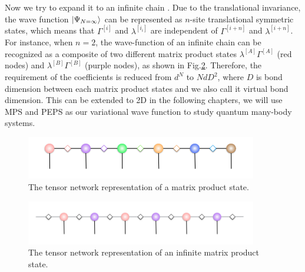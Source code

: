 Now we try to expand it to an infinite chain \cite{PhysRevLett.98.070201}. Due to the translational invariance, the wave function $\Ket{\Psi_{N=\infty}}$ can be represented as $n$-site translational symmetric states, which means that $\Gamma^{[i]}$ and $\lambda^{[i_{i}]}$ are independent of $\Gamma^{[i+n]}$ and $\lambda^{[i+n]}$. For instance, when $n=2$, the wave-function of an infinite chain can be recognized as a composite of two different matrix product states $\lambda^{[A]}\Gamma^{[A]}$ (red nodes) and $\lambda^{[B]}\Gamma^{[B]}$ (purple nodes), as shown in Fig.\ref{fig312}. Therefore, the requirement of the coefficients is reduced from $d^N$ to $NdD^2$, where $D$ is bond dimension between each matrix product states and we also call it virtual bond dimension. 
This can be extended to 2D 
in the following chapters, we will use MPS and PEPS as our variational wave function to study quantum many-body systems.

\begin{figure}[hb]
	\centering
	\includegraphics[width=0.90\textwidth]{figures/fig3111.png}
	\caption[The tensor network representation of matrix product states]{The tensor network representation of a matrix product state.}
	\label{fig311}
\end{figure}

\begin{figure}[hb]
	\centering
	\includegraphics[width=0.90\textwidth]{figures/fig311.png}
	\caption[The tensor network representation of infinite matrix product states]{The tensor network representation of an infinite matrix product state.}
	\label{fig312}
\end{figure}
